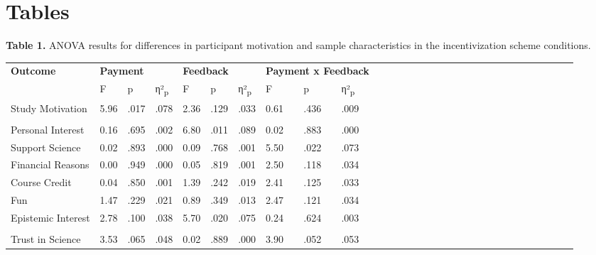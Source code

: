 \documentclass[authordate, empirical]{jote-new-article}
\begin{document}
	\section{\textbf{Tables}}



	\textbf{Table 1. }ANOVA results for differences in participant motivation and sample characteristics in the incentivization scheme conditions.

	\begin{table}
		\begin{tabularx}{\linewidth}{@{} l l l l l l l l l l l l l l l l l l l l l l l l l l l l l l @{}}
			\hline \textbf{Outcome} & \multicolumn{3}{l}{\textbf{Payment}} & \multicolumn{3}{l}{\textbf{Feedback}}
			& \multicolumn{3}{l}{\textbf{Payment x Feedback}} \\

			  & F & p & η²\textsubscript{p} & F & p & η²\textsubscript{p} & F & p & η²\textsubscript{p}
			\\

			\hline Study Motivation & 5.96 & .017 & .078 & 2.36 & .129 & .033 & 0.61 &
			.436 & .009 \\

			  &  &  &  &  &  &  &  &  &  \\

			 Personal Interest & 0.16 & .695 & .002 & 6.80 & .011 & .089 & 0.02 & .883
			& .000 \\

			 Support Science & 0.02 & .893 & .000 & 0.09 & .768 & .001 & 5.50 & .022 &
			.073 \\

			 Financial Reasons & 0.00 & .949 & .000 & 0.05 & .819 & .001 & 2.50 & .118
			& .034 \\

			 Course Credit & 0.04 & .850 & .001 & 1.39 & .242 & .019 & 2.41 & .125 & .033
			\\

			 Fun & 1.47 & .229 & .021 & 0.89 & .349 & .013 & 2.47 & .121 & .034 \\

			 Epistemic Interest & 2.78 & .100 & .038 & 5.70 & .020 & .075 & 0.24 & .624
			& .003 \\

			  &  &  &  &  &  &  &  &  &  \\

			 Trust in Science & 3.53 & .065 & .048 & 0.02 & .889 & .000 & 3.90 & .052 &
			.053 \\


\end{tabularx}
\end{table}
\end{document}
